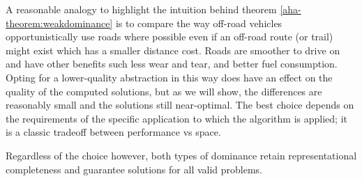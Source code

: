 \par \indent
A reasonable analogy to highlight the intuition behind theorem \ref{aha-theorem:weakdominance} is to compare the way off-road vehicles opportunistically use roads where possible even if an off-road route (or trail) might exist which has a smaller distance cost. Roads are smoother to drive on and have other benefits such less wear and tear, and better fuel consumption. Opting for a lower-quality abstraction in this way does have an effect on the quality of the computed solutions, but as we will show, the differences are reasonably small and the solutions still near-optimal. The best choice depends on the requirements of the specific application to which the algorithm is applied; it is a classic tradeoff between performance vs space.
\par \indent
Regardless of the choice however, both types of dominance retain representational completeness and guarantee solutions for all valid problems.


